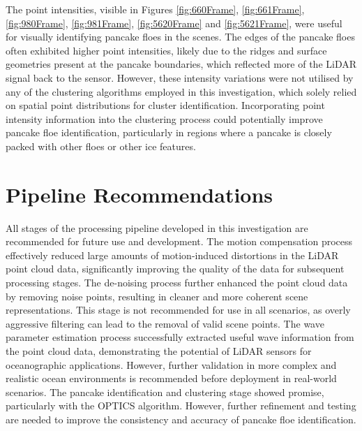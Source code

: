 The point intensities, visible in Figures \ref{fig:660Frame}, \ref{fig:661Frame}, \ref{fig:980Frame}, \ref{fig:981Frame}, \ref{fig:5620Frame} and \ref{fig:5621Frame}, were useful for visually identifying pancake floes in the scenes. The edges of the pancake floes often exhibited higher point intensities, likely due to the ridges and surface geometries present at the pancake boundaries, which reflected more of the \ac{LiDAR} signal back to the sensor. However, these intensity variations were not utilised by any of the clustering algorithms employed in this investigation, which solely relied on spatial point distributions for cluster identification. Incorporating point intensity information into the clustering process could potentially improve pancake floe identification, particularly in regions where a pancake is closely packed with other floes or other ice features.

\section{Pipeline Recommendations}
\label{sec:ch8.section3}

All stages of the processing pipeline developed in this investigation are recommended for future use and development. The motion compensation process effectively reduced large amounts of motion-induced distortions in the \ac{LiDAR} point cloud data, significantly improving the quality of the data for subsequent processing stages. The de-noising process further enhanced the point cloud data by removing noise points, resulting in cleaner and more coherent scene representations. This stage is not recommended for use in all scenarios, as overly aggressive filtering can lead to the removal of valid scene points. The wave parameter estimation process successfully extracted useful wave information from the point cloud data, demonstrating the potential of \ac{LiDAR} sensors for oceanographic applications. However, further validation in more complex and realistic ocean environments is recommended before deployment in real-world scenarios. The pancake identification and clustering stage showed promise, particularly with the \ac{OPTICS} algorithm. However, further refinement and testing are needed to improve the consistency and accuracy of pancake floe identification.

